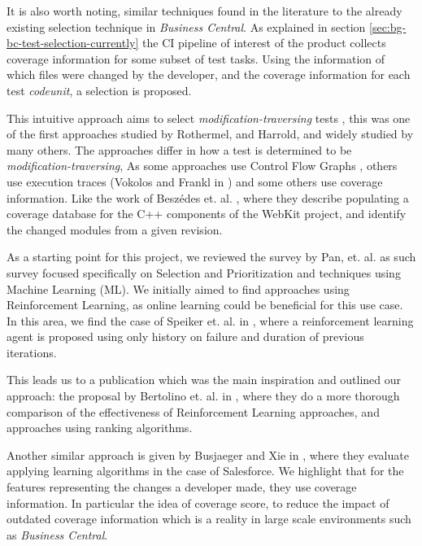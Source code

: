 It is also worth noting, similar techniques found in the literature to the already 
existing selection technique in \emph{Business Central}. As explained in section \ref{sec:bg-bc-test-selection-currently}
the CI pipeline of interest of the product collects coverage information for some subset of test tasks.
Using the information of which files were changed by the developer, and the coverage information
for each test \emph{codeunit}, a selection is proposed. 

This intuitive approach aims to select \emph{modification-traversing} tests \cite{536955}, 
this was one of the first approaches studied by Rothermel, and Harrold, and widely studied by many others.
The approaches differ in how a test is determined to be \emph{modification-traversing}, 
As some approaches use Control Flow Graphs \cite{366926}, others use execution traces (Vokolos and Frankl in \cite{Vokolos1997PythiaAR})
and some others use coverage information. Like the work of Beszédes et. al. \cite{Beszdes2012CodeCR}, where they
describe populating a coverage database for the C++ components of the WebKit project,
and identify the changed modules from a given revision.

As a starting point for this project, we reviewed the survey by Pan, et. al. \cite{Pan2021TestCS} as 
such survey focused specifically on Selection and Prioritization and techniques using 
Machine Learning (ML). We initially aimed to find approaches using Reinforcement Learning,
as online learning could be beneficial for this use case. In this area, we find the case of
Speiker et. al. in \cite{DBLP:journals/corr/abs-1811-04122}, where a reinforcement learning agent is proposed using only
history on failure and duration of previous iterations.

This leads us to a publication which was the main inspiration and outlined our approach:
the proposal by Bertolino et. al. in \cite{Bertolino2020LearningtoRankVR}, where they do a
more thorough comparison of the effectiveness of Reinforcement Learning approaches, and
approaches using ranking algorithms.

Another similar approach is given by Busjaeger and Xie in \cite{Busjaeger2016LearningFT}, where they evaluate 
applying learning algorithms in the case of Salesforce. We highlight that for the features representing
the changes a developer made, they use coverage information. In particular the idea of coverage score, to 
reduce the impact of outdated coverage information which is a reality in large scale environments such
as \emph{Business Central}.

